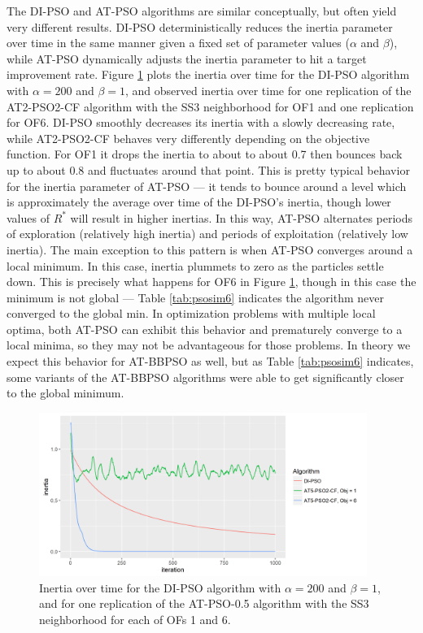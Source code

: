 \documentclass[cmbright]{staauth}
\begin{document}
The DI-PSO and AT-PSO algorithms are similar conceptually, but often yield very different results. DI-PSO deterministically reduces the inertia parameter over time in the same manner given a fixed set of parameter values ($\alpha$ and $\beta$), while AT-PSO dynamically adjusts the inertia parameter to hit a target improvement rate. Figure \ref{fig:inertia} plots the inertia over time for the DI-PSO algorithm with $\alpha=200$ and $\beta=1$, and observed inertia over time for one replication of the AT2-PSO2-CF algorithm with the SS3 neighborhood for OF1 and one replication for OF6. DI-PSO smoothly decreases its inertia with a slowly decreasing rate, while AT2-PSO2-CF behaves very differently depending on the objective function. For OF1 it drops the inertia to about to about 0.7 then bounces back up to about 0.8 and fluctuates around that point. This is pretty typical behavior for the inertia parameter of AT-PSO --- it tends to bounce around a level which is approximately the average over time of the DI-PSO's inertia, though lower values of $R^*$ will result in higher inertias. In this way, AT-PSO alternates periods of exploration (relatively high inertia) and periods of exploitation (relatively low inertia). The main exception to this pattern is when AT-PSO converges around a local minimum. In this case, inertia plummets to zero as the particles settle down. This is precisely what happens for OF6 in Figure \ref{fig:inertia}, though in this case the minimum is not global --- Table \ref{tab:psosim6} indicates the algorithm never converged to the global min. In optimization problems with multiple local optima, both AT-PSO can exhibit this behavior and prematurely converge to a local minima, so they may not be advantageous for those problems. In theory we expect this behavior for AT-BBPSO as well, but as Table \ref{tab:psosim6} indicates, some variants of the AT-BBPSO algorithms were able to get significantly closer to the global minimum.

\begin{figure}[!ht]
\centering
\includegraphics[width=0.95\textwidth]{../code/psosims/inertiaplot.png}
\caption{Inertia over time for the DI-PSO algorithm with $\alpha=200$ and $\beta=1$, and for one replication of the AT-PSO-0.5 algorithm with the SS3 neighborhood for each of OFs 1 and 6.}
\label{fig:inertia}
\end{figure}
\end{document}

